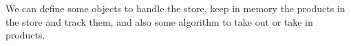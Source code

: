 We can define some objects to handle the store, keep in memory the products in the store and track them, and also some algorithm to take out or take in products.


%














